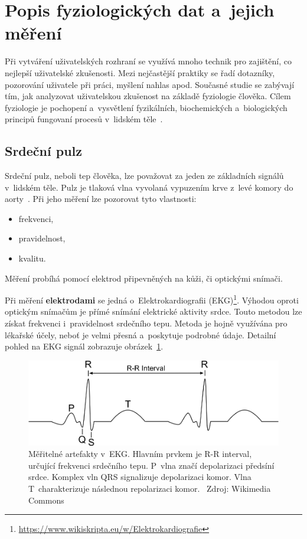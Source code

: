     \section{Popis fyziologických dat a~jejich měření}
    \label{popis_dat_mereni}
        Při vytváření uživatelských rozhraní se využívá mnoho technik pro zajištění, co nejlepší uživatelské zkušenosti. Mezi nejčastější praktiky se řadí dotazníky, pozorování uživatele při práci, myšlení nahlas apod. \newline
        Současné studie se zabývají tím, jak analyzovat uživatelskou zkušenost na základě fyziologie člověka. Cílem fyziologie je pochopení a~vysvětlení fyzikálních, biochemických a~biologických principů fungovaní procesů v~lidském těle~\cite{wiki:fyzio}.
        
        \subsection{Srdeční pulz}
        \label{srdecni_tep}
        Srdeční pulz, neboli tep člověka, lze považovat za jeden ze základních signálů v~lidském těle. Pulz je tlaková vlna vyvolaná vypuzením krve z~levé komory do aorty~\cite{wiki:fyzio_sledovani}. Při jeho měření lze pozorovat tyto vlastnosti:
        \begin{itemize}
            \item frekvenci,
            \item pravidelnost,
            \item kvalitu.
        \end{itemize}
        
        Měření probíhá pomocí elektrod připevněných na kůži, či optickými snímači.
        
        Při měření \textbf{elektrodami} se jedná o~Elektrokardiografii (EKG)\footnote{\url{https://www.wikiskripta.eu/w/Elektrokardiografie}}. Výhodou oproti optickým snímačům je přímé snímání elektrické aktivity srdce. Touto metodou lze získat frekvenci i~pravidelnost srdečního tepu. Metoda je hojně využívána pro lékařské účely, neboť je velmi přesná a~poskytuje podrobné údaje. Detailní pohled na EKG signál zobrazuje obrázek~\ref{fig:ecg}.
        
        \begin{figure}[H]
            \centering
            \includegraphics[width=\textwidth]{obrazky-figures/Ecg.png}
            \caption{Měřitelné artefakty v~EKG. Hlavním prvkem je R-R interval, určující frekvenci srdečního tepu. P~vlna značí depolarizaci předsíní srdce. Komplex vln QRS signalizuje depolarizaci komor. Vlna T~charakterizuje následnou repolarizaci komor.~\cite{wiki_ecg} Zdroj: Wikimedia Commons~\cite{wiki:commons}}
            \label{fig:ecg}
        \end{figure}
        
